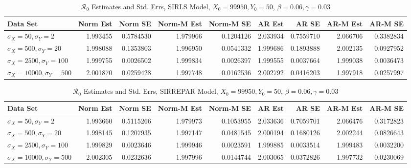 \documentclass[12pt]{article}
\newcommand{\rr}{\ensuremath{\mathcal{R}_0}}
\begin{document}
\begin{table}[H]
	\caption{\label{tab:}$\rr$ Estimates and Std. Errs, SIRLS Model,
		$X_0 = 99950, Y_0 = 50$, $\beta = 0.06, \gamma = 0.03$}
	\centering
	\begin{footnotesize}
	\begin{tabular}[t]{l|r|r|r|r|r|r|r|r}
		\hline
		Data Set & Norm Est & Norm SE & Norm-M Est & Norm-M SE & AR Est & AR SE & AR-M Est & AR-M SE\\
		\hline
		$\sigma_X = 50, \sigma_Y = 2$ & 1.993455 & 0.5784530 & 1.979966 & 0.1204126 & 2.033934 & 0.7559710 & 2.066706 & 0.3382834\\
		\hline
		$\sigma_X = 500, \sigma_Y = 20$ & 1.998088 & 0.1353803 & 1.996950 & 0.0541332 & 1.999686 & 0.1893888 & 2.002135 & 0.0927952\\
		\hline
		$\sigma_X = 2500, \sigma_Y = 100$ & 1.999755 & 0.0026502 & 1.999834 & 0.0026397 & 1.999555 & 0.0037664 & 1.999038 & 0.0036473\\
		\hline
		$\sigma_X = 10000, \sigma_Y = 500$ & 2.001870 & 0.0259428 & 1.997748 & 0.0162536 & 2.002792 & 0.0416203 & 1.997918 & 0.0257997\\
		\hline
	\end{tabular}
\end{footnotesize}
\end{table}
\begin{table}[H]
	
	\caption{\label{tab:}$\rr$ Estimates and Std. Errs, SIRREPAR Model,
		$X_0 = 99950, Y_0 = 50$, $\beta = 0.06, \gamma = 0.03$}
	\centering
	\begin{footnotesize}
	\begin{tabular}[t]{l|r|r|r|r|r|r|r|r}
		\hline
		Data Set & Norm Est & Norm SE & Norm-M Est & Norm-M SE & AR Est & AR SE & AR-M Est & AR-M SE\\
		\hline
		$\sigma_X = 50, \sigma_Y = 2$ & 1.993660 & 0.5115266 & 1.979973 & 0.1053955 & 2.033636 & 0.7059701 & 2.066476 & 0.3172823\\
		\hline
		$\sigma_X = 500, \sigma_Y = 20$ & 1.998145 & 0.1207935 & 1.997147 & 0.0481545 & 2.000194 & 0.1680126 & 2.002244 & 0.0826643\\
		\hline
		$\sigma_X = 2500, \sigma_Y = 100$ & 1.999829 & 0.0023646 & 1.999946 & 0.0023591 & 1.999885 & 0.0033514 & 1.999483 & 0.0032200\\
		\hline
		$\sigma_X = 10000, \sigma_Y = 500$ & 2.002305 & 0.0232636 & 1.997996 & 0.0144744 & 2.003065 & 0.0372826 & 1.997732 & 0.0230069\\
		\hline
	\end{tabular}
\end{footnotesize}
\end{table}
\end{document}
